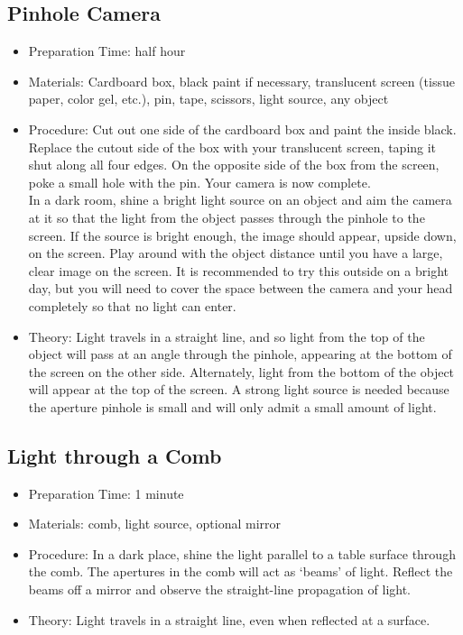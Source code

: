 \subsection{Pinhole Camera}
\begin{itemize}
\item{Preparation Time: half hour}
\item{Materials: Cardboard box, black paint if necessary, translucent screen (tissue paper, color gel, etc.), pin, tape, scissors, light source, any object}
\item{Procedure: Cut out one side of the cardboard box and paint the inside black. Replace the cutout side of the box with your translucent screen, taping it shut along all four edges. On the opposite side of the box from the screen, poke a small hole with the pin. Your camera is now complete.\\
In a dark room, shine a bright light source on an object and aim the camera at it so that the light from the object passes through the pinhole to the screen. If the source is bright enough, the image should appear, upside down, on the screen. Play around with the object distance until you have a large, clear image on the screen. It is recommended to try this outside on a bright day, but you will need to cover the space between the camera and your head completely so that no light can enter.}
\item{Theory: Light travels in a straight line, and so light from the top of the object will pass at an angle through the pinhole, appearing at the bottom of the screen on the other side. Alternately, light from the bottom of the object will appear at the top of the screen. A strong light source is needed because the aperture pinhole is small and will only admit a small amount of light.}
\end{itemize}

\subsection{Light through a Comb}
\begin{itemize}
\item{Preparation Time: 1 minute}
\item{Materials: comb, light source, optional mirror}
\item{Procedure: In a dark place, shine the light parallel to a table surface through the comb. The apertures in the comb will act as ‘beams’ of light. Reflect the beams off a mirror and observe the straight-line propagation of light.}
\item{Theory: Light travels in a straight line, even when reflected at a surface.}
\end{itemize}

